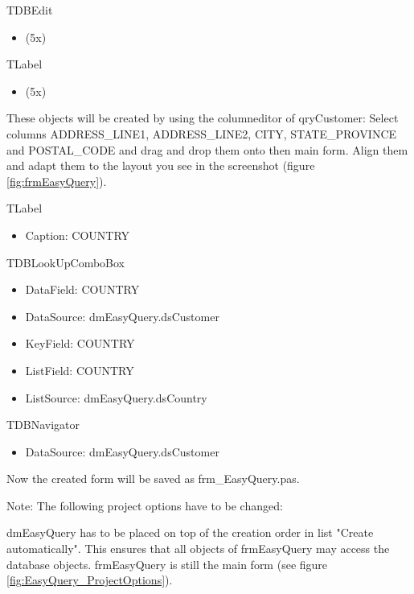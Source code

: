 \documentclass[a4paper,12pt,oneside]{book}
\begin{document}
TDBEdit
\begin{itemize}
  \item (5x)
\end{itemize}

TLabel
\begin{itemize}
  \item (5x)
\end{itemize}

These objects will be created by using the columneditor of qryCustomer:
Select columns ADDRESS\_LINE1, ADDRESS\_LINE2, CITY, STATE\_PROVINCE and POSTAL\_CODE and drag and drop them onto then main form.
Align them and adapt them to the layout you see in the screenshot (figure \ref{fig:frmEasyQuery}).

TLabel
\begin{itemize}
  \item Caption: COUNTRY
\end{itemize}

TDBLookUpComboBox
\begin{itemize}
  \item DataField: COUNTRY
	\item DataSource: dmEasyQuery.dsCustomer
	\item KeyField: COUNTRY
	\item ListField: COUNTRY
	\item ListSource: dmEasyQuery.dsCountry
\end{itemize}

TDBNavigator
\begin{itemize}
  \item DataSource: dmEasyQuery.dsCustomer
\end{itemize}

Now the created form will be saved as frm\_EasyQuery.pas.

Note: The following project options have to be changed:

dmEasyQuery has to be placed on top of the creation order in list "Create automatically".
This ensures that all objects of frmEasyQuery may access the database objects.
frmEasyQuery is still the main form (see figure \ref{fig:EasyQuery_ProjectOptions}).
	
\end{document}
